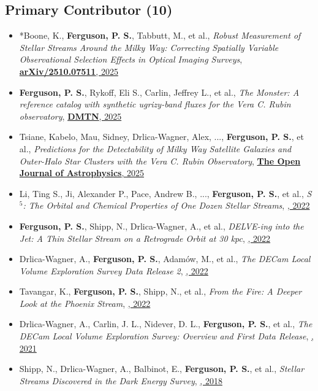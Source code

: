 \renewcommand{\labelitemi}{$$}
\subsection{Primary Contributor  (10)}
\begin{itemize}[itemsep=1pt]
    \item *{Boone}, K., \textbf{Ferguson, P. S.}, {Tabbutt}, M., et al., \textit{{Robust Measurement of Stellar Streams Around the Milky Way: Correcting Spatially Variable Observational Selection Effects in Optical Imaging Surveys}}, \href{https://ui.adsabs.harvard.edu/abs/2025arXiv251007511B}{\textbf{arXiv/2510.07511}, 2025}
    \item \textbf{Ferguson, P. S.}, {Rykoff}, Eli S., {Carlin}, Jeffrey L., et al., \textit{The Monster: A reference catalog with synthetic ugrizy-band fluxes for the Vera C. Rubin observatory}, \href{https://doi.org/10.71929/rubin/2583688}{\textbf{DMTN}, 2025}
    \item {Tsiane}, Kabelo, {Mau}, Sidney, {Drlica-Wagner}, Alex, ..., \textbf{Ferguson, P. S.}, et al., \textit{{Predictions for the Detectability of Milky Way Satellite Galaxies and Outer-Halo Star Clusters with the Vera C. Rubin Observatory}}, \href{https://ui.adsabs.harvard.edu/abs/2025OJAp....8E..89T}{\textbf{The Open Journal of Astrophysics}, 2025}
    \item {Li}, Ting S., {Ji}, Alexander P., {Pace}, Andrew B., ..., \textbf{Ferguson, P. S.}, et al., \textit{{S $^{5}$: The Orbital and Chemical Properties of One Dozen Stellar Streams}}, \href{https://ui.adsabs.harvard.edu/abs/2022ApJ...928...30L}{\textbf{\apj}, 2022}
    \item \textbf{Ferguson, P. S.}, {Shipp}, N., {Drlica-Wagner}, A., et al., \textit{{DELVE-ing into the Jet: A Thin Stellar Stream on a Retrograde Orbit at 30 kpc}}, \href{https://ui.adsabs.harvard.edu/abs/2022AJ....163...18F}{\textbf{\aj}, 2022}
    \item {Drlica-Wagner}, A., \textbf{Ferguson, P. S.}, {Adam{\'o}w}, M., et al., \textit{{The DECam Local Volume Exploration Survey Data Release 2}}, \href{https://ui.adsabs.harvard.edu/abs/2022ApJS..261...38D}{\textbf{\apjs}, 2022}
    \item {Tavangar}, K., \textbf{Ferguson, P. S.}, {Shipp}, N., et al., \textit{{From the Fire: A Deeper Look at the Phoenix Stream}}, \href{https://ui.adsabs.harvard.edu/abs/2022ApJ...925..118T}{\textbf{\apj}, 2022}
    \item {Drlica-Wagner}, A., {Carlin}, J. L., {Nidever}, D. L., \textbf{Ferguson, P. S.}, et al., \textit{{The DECam Local Volume Exploration Survey: Overview and First Data Release}}, \href{https://ui.adsabs.harvard.edu/abs/2021ApJS..256....2D}{\textbf{\apjs}, 2021}
    \item {Shipp}, N., {Drlica-Wagner}, A., {Balbinot}, E., \textbf{Ferguson, P. S.}, et al., \textit{{Stellar Streams Discovered in the Dark Energy Survey}}, \href{https://ui.adsabs.harvard.edu/abs/2018ApJ...862..114S}{\textbf{\apj}, 2018}
\end{itemize}
